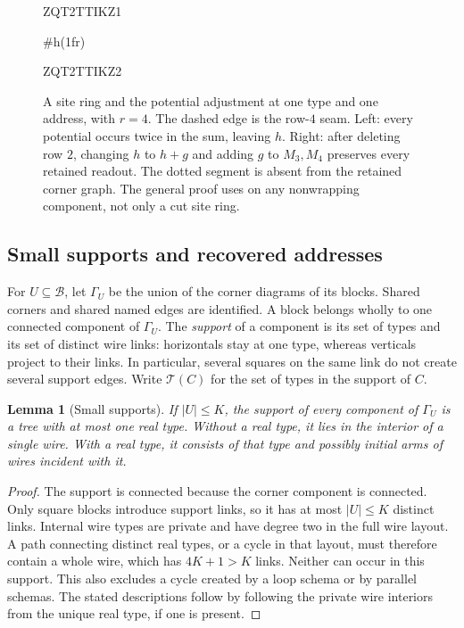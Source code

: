 \documentclass[11pt]{article}
\newtheorem{lemma}[theorem]{Lemma}
\theoremstyle{definition}
\begin{document}
\begin{figure}[tbp]

\begin{minipage}[t]{0.47\linewidth}

ZQT2TTIKZ1
\end{minipage}#h(1fr) 
\begin{minipage}[t]{0.50\linewidth}

ZQT2TTIKZ2
\end{minipage}
\caption{A site ring and the potential adjustment at one type and
one address, with $r=4$.  The dashed edge is the row-$4$ seam.
Left: every potential occurs twice in the sum, leaving $h$.
Right: after deleting row $2$, changing $h$ to $h+g$ and adding $g$
to $M_3,M_4$ preserves every retained readout.  The dotted segment
is absent from the retained corner graph.  The general proof uses
 on any nonwrapping component,
not only a cut site ring.}
\label{fig:projection-gauge}
\end{figure}


\subsection{Small supports and recovered addresses}
\label{offset:small-supports}

For \(U\subseteq\mathcal B\), let \(\Gamma_U\) be the union of the corner
diagrams of its blocks. Shared corners and shared named edges are
identified. A block belongs wholly to one connected component of
\(\Gamma_U\). The \emph{support} of a component is its set of types and
its set of distinct wire links: horizontals stay at one type, whereas
verticals project to their links. In particular, several squares on the
same link do not create several support edges.
Write \(\mathcal T(C)\) for the set of types in the support of \(C\).

\begin{lemma}[Small supports]
\label{offset:lem-support}
If \(\left\lvert{U}\right\rvert\le K\), the support of every component of \(\Gamma_U\) is a
tree with at most one real type. Without a real type, it lies in the
interior of a single wire. With a real type, it consists of that type
and possibly initial arms of wires incident with it.
\end{lemma}

\begin{proof}
The support is connected because the corner component is connected.
Only square blocks introduce support links, so it has at most
\(\left\lvert{U}\right\rvert\le K\) distinct links. Internal wire types are private and have
degree two in the full wire layout. A path connecting distinct real
types, or a cycle in that layout, must therefore contain a whole wire,
which has \(4K+1>K\) links. Neither can occur in this support.
This also excludes a cycle created by a loop schema or by parallel
schemas. The stated descriptions follow by following the private wire
interiors from the unique real type, if one is present.
\end{proof}
\end{document}
